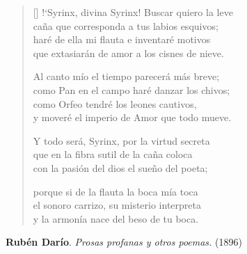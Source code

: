 \begin{verse}[\versewidth]
!`Syrinx, divina Syrinx! Buscar quiero la leve \\
caña que corresponda a tus labios esquivos; \\
haré de ella mi flauta e inventaré motivos \\
que extasiarán de amor a los cisnes de nieve.

Al canto mío el tiempo parecerá más breve; \\
como Pan en el campo haré danzar los chivos; \\
como Orfeo tendré los leones cautivos, \\
y moveré el imperio de Amor que todo mueve.

Y todo será, Syrinx, por la virtud secreta \\
que en la fibra sutil de la caña coloca \\
con la pasión del dios el sueño del poeta;

porque si de la flauta la boca mía toca \\
el sonoro carrizo, su misterio interpreta \\
y la armonía nace del beso de tu boca.
\end{verse}

\bigskip \bigskip

\hspace*{10mm} {\bf Rubén Darío}. {\em Prosas profanas y otros poemas.} (1896)
